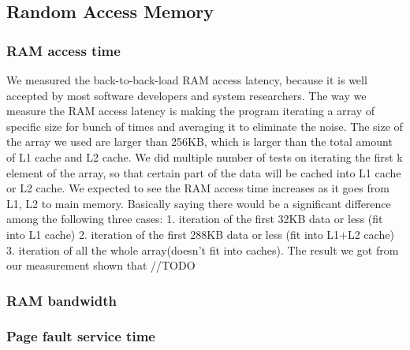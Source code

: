 \subsection{Random Access Memory}

\subsubsection{RAM access time}
We measured the back-to-back-load RAM access latency, because it is well accepted by most software developers and system researchers. The way we measure the RAM access latency is making the program iterating a array of specific size for bunch of times and averaging it to eliminate the noise. The size of the array we used are larger than 256KB, which is larger than the total amount of L1 cache and L2 cache. We did multiple number of tests on iterating the first k element of the array, so that certain part of the data will be cached into L1 cache or L2 cache.
We expected to see the RAM access time increases as it goes from L1, L2 to main memory. Basically saying there would be a significant difference among the following three cases: 
1. iteration of the first 32KB data or less (fit into L1 cache)
2. iteration of the first 288KB data or less (fit into L1+L2 cache)
3. iteration of all the whole array(doesn’t fit into caches).
The result we got from our measurement shown that //TODO






\subsubsection{RAM bandwidth}






\subsubsection{Page fault service time}



















